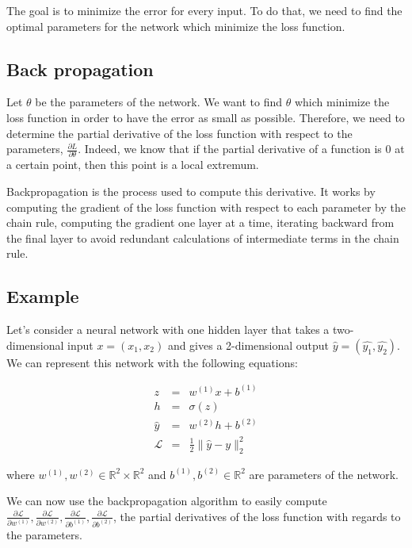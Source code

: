 \documentclass[10pt,a4paper]{article}
\theoremstyle{definition}
\theoremstyle{definition}
\theoremstyle{definition}
\begin{document}
The goal is to minimize the error for every input. To do that, we need to find the optimal parameters for the network which minimize the loss function.



\subsection{Back propagation}
Let $\theta$ be the parameters of the network. We want to find $\theta$ which minimize the loss function in order to have the error as small as possible. Therefore, we need to determine the partial derivative of the loss function with respect to the parameters, $\frac{\partial L}{\partial \theta}$. Indeed, we know that if the partial derivative of a function is $0$ at a certain point, then this point is a local extremum. 

Backpropagation is the process used to compute this derivative. It works by computing the gradient of the loss function with respect to each parameter by the chain rule, computing the gradient one layer at a time, iterating backward from the final layer to avoid redundant calculations of intermediate terms in the chain rule.

\subsection{Example} \label{exnn}
Let's consider a neural network with one hidden layer that takes a two-dimensional input $x = (x_1, x_2)$ and gives a 2-dimensional output $\hat{y} = (\hat{y_1},\hat{y_2})$. We can represent this network with the following equations:

\begin{eqnarray*}
z & = & w^{(1)}x + b^{(1)} \\ 
h & = & \sigma (z)\\
\hat{y} & = &  w^{(2)}h + b^{(2)} \\
\mathcal{L} & = & \frac{1}{2} \| \hat{y} - y \|_2^2
\end{eqnarray*}
   
where $w^{(1)}, w^{(2)} \in \mathbb{R}^2\times \mathbb{R}^2$ and $b^{(1)}, b^{(2)} \in \mathbb{R}^2$ are parameters of the network.

We can now use the backpropagation algorithm to easily compute $\frac{\partial \mathcal{L}}{\partial w^{(1)}}, \frac{\partial \mathcal{L}}{\partial w^{(2)}},\frac{\partial \mathcal{L}}{\partial b^{(1)}},\frac{\partial \mathcal{L}}{\partial b^{(2)}}$, the partial derivatives of the loss function with regards to the parameters.
\end{document}
